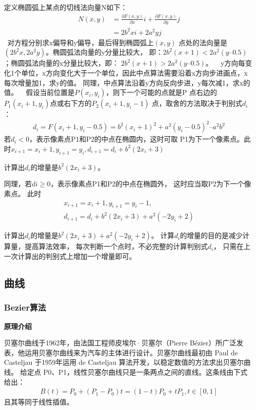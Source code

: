 \documentclass[a4paper,UTF8]{article}
\theoremstyle{definition}
\begin{document}
定义椭圆弧上某点的切线法向量N如下：
\begin{align}
N(x,y) &= \frac{\partial F(x,y)}{\partial x}i + \frac{\partial F(x,y)}{\partial y}j \\
& = 2b^2xi+2a^2yj
\end{align}
 对方程分别求x偏导和y偏导，最后得到椭圆弧上$(x,y)$
点处的法向量是$(2b^2x,2a^2y)$。椭圆弧法向量的y分量比较大，
即：$2b^2(x+1)<2a^2(y–0.5)$；椭圆弧法向量的x分量比较大，即：
$2b^2(x+1)>2a^2(y–0.5)$。
 
y方向每变化1个单位，x方向变化大于一个单位，因此中点算法需要沿着x方向步进画点，x每次增量加1，求y的值。
同理，中点算法沿着y方向反向步进，y每次减1，求x的值。
 
假设当前位置是$P(x_i,y_i)$，则下一个可能的点就是P
点右边的$P_1(x_i+1,y_i)$点或右下方的$P_2(x_i+1,y_i-1)$
点，取舍的方法取决于判别式$d_i$：
\begin{align}
d_i=F(x_i+1,y_i-0.5)=b^2{(x_i+1)}^2+a^2{(y_i-0.5)}^2–a^2b^2
\end{align}
若$d_i<0$，表示像素点P1和P2的中点在椭圆内，这时可取
P1为下一个像素点。此时$x_{i+1}=x_i+1,y_{i+1}=y_i,d_{i+1}=d_i+b^2(2x_i+3)$

计算出$d_i$的增量是$b^2(2x_i+3)$。

同理，若$di\geq0$，表示像素点P1和P2的中点在椭圆外，
这时应当取P2为下一个像素点。
此时
\begin{align}
x_{i+1}=x_i+1,y_{i+1}=y_i-1,\\
d_{i+1}=d_i+b^2(2x_i+3)+a^2(-2y_i+2)
\end{align}

计算出$d_i$的增量是$b^2(2x_i+3)+a^2(-2y_i+2)$。
计算$d_i$的增量的目的是减少计算量，提高算法效率，
每次判断一个点时，不必完整的计算判别式$d_i$，
只需在上一次计算出的判别式上增加一个增量即可。
\cite{Circle}



\subsection{曲线}
\subsubsection{Bezier算法}
\textbf{原理介绍}\par
贝塞尔曲线于1962年，由法国工程师皮埃尔·贝塞尔（Pierre Bézier）所广泛发表，他运用贝塞尔曲线来为汽车的主体进行设计。贝塞尔曲线最初由 Paul de Casteljau 于1959年运用 de Casteljau 算法开发，以稳定数值的方法求出贝塞尔曲线。
给定点 P0、P1，线性贝塞尔曲线只是一条两点之间的直线。这条线由下式给出：
\begin{align}
B(t)=P_0+(P_1-P_0)t=(1-t)P_0+tP_1,t\in[0,1]
\end{align}
且其等同于线性插值。
\end{document}
